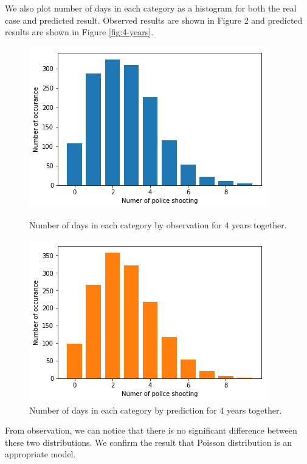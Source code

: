 \documentclass[11pt,a4paper,english]{article}
\begin{document}
We also plot number of days in each category as a histogram for both the real case and predicted result. Observed results are shown in Figure 2 and predicted results are shown in Figure \ref{fig:4-years}.
\begin{figure}[htbp]
	\centering
	\begin{multicols}{2}
		\includegraphics[width=\linewidth]{4-years.png}
		\caption{Number of days in each category by observation for 4 years together.}
		\label{fig:4-years}

		\includegraphics[width=\linewidth]{poisson.png}
		\caption{Number of days in each category by prediction for 4 years together.}
		\label{fig:poisson}
	\end{multicols}
\end{figure}

From observation, we can notice that there is no significant difference between these two distributions. We confirm the result that Poisson distribution is an appropriate model.
\end{document}
